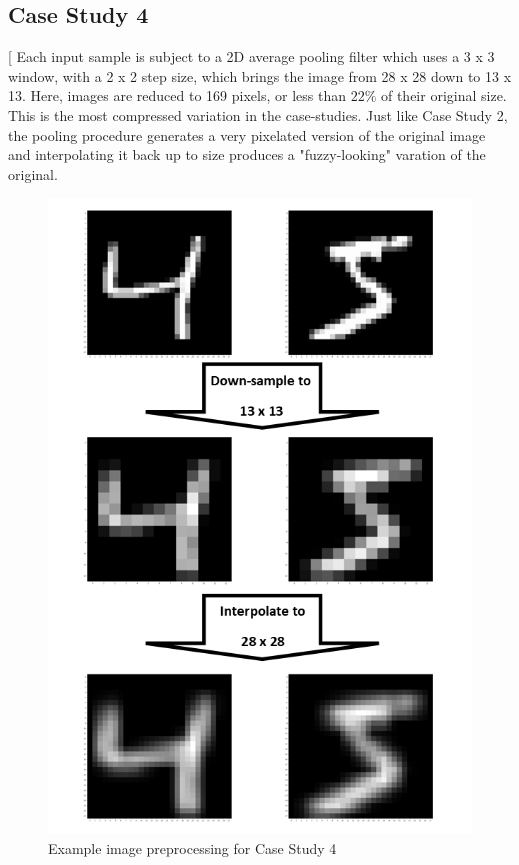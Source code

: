 \documentclass{IEEEtran}
\begin{document}
\subsection{Case Study 4}[
Each input sample is subject to a 2D average pooling filter which uses a 3 x 3 window, with a 2 x 2 step size, which brings the image from 28 x 28 down to 13 x 13. Here, images are reduced to 169 pixels, or less than $22\%$ of their original size. This is the most compressed variation in the case-studies. Just like Case Study 2, the pooling procedure generates a very pixelated version of the original image and interpolating it back up to size produces a "fuzzy-looking" varation of the original.
\begin{figure}[!h]
    \centering
    \includegraphics[scale=0.5]{fig/caseStudy4.png}
    \caption{Example image preprocessing for Case Study 4}
    \label{fig:caseStudy4}
\end{figure}
\end{document}

